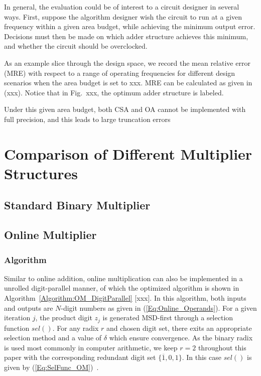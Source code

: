 \documentclass[10pt, conference, compsocconf]{IEEEtran}
\begin{document}
In general, the evaluation could be of interest to a circuit designer in several ways. First, suppose the algorithm designer wish the circuit to run at a given frequency within a given area budget, while achieving the minimum output error. Decisions must then be made on which adder structure achieves this minimum, and whether the circuit should be overclocked. 

As an example slice through the design space, we record the mean relative error (MRE) with respect to a range of operating frequencies for different design scenarios when the area budget is set to xxx. MRE can be calculated as given in (xxx). Notice that in Fig.~xxx, the optimum adder structure is labeled. 

Under this given area budget, both CSA and OA cannot be implemented with full precision, and this leads to large truncation errors 

\section{Comparison of Different Multiplier Structures}
\subsection{Standard Binary Multiplier}

\subsection{Online Multiplier}
\subsubsection{Algorithm}
Similar to online addition, online multiplication can also be implemented in a unrolled digit-parallel manner, of which the optimized algorithm is shown in Algorithm~\ref{Algorithm:OM_DigitParallel} [xxx]. In this algorithm, both inputs and outputs are $N$-digit numbers as given in (\ref{Eq:Online_Operands}). For a given iteration $j$, the product digit $z_j$ is generated MSD-first through a selection function $sel()$. For any radix $r$ and chosen digit set, there exits an appropriate selection method and a value of $\delta$ which ensure convergence. As the binary radix is used most commonly in computer arithmetic, we keep $r=2$ throughout this paper with the corresponding redundant digit set $\{\overline{1},0,1\}$. In this case $sel()$ is given by (\ref{Eq:SelFunc_OM})~\cite{Ercegovac_OnlineMult}.
\end{document}

